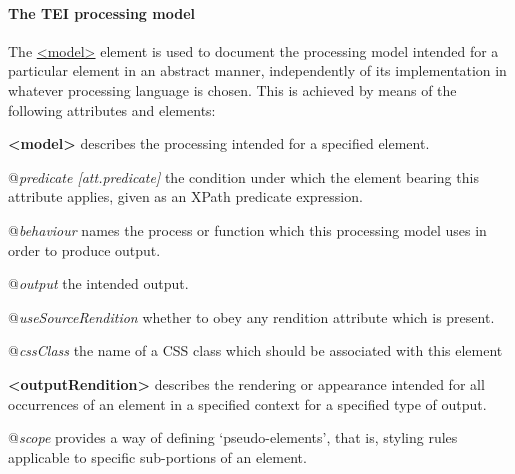\paragraph[{The TEI processing model}]{The TEI processing model}\label{TDPMPM}\par
The \hyperref[TEI.model]{<model>} element is used to document the processing model intended for a particular element in an abstract manner, independently of its implementation in whatever processing language is chosen. This is achieved by means of the following attributes and elements: 
\begin{sansreflist}
  
\item [\textbf{<model>}] describes the processing intended for a specified element.\hfil\\[-10pt]\begin{sansreflist}
    \item[@{\itshape predicate [att.predicate]}]
  the condition under which the element bearing this attribute applies, given as an XPath predicate expression.
    \item[@{\itshape behaviour}]
  names the process or function which this processing model uses in order to produce output.
    \item[@{\itshape output}]
  the intended output.
    \item[@{\itshape useSourceRendition}]
  whether to obey any rendition attribute which is present.
    \item[@{\itshape cssClass}]
  the name of a CSS class which should be associated with this element
\end{sansreflist}  
\item [\textbf{<outputRendition>}] describes the rendering or appearance intended for all occurrences of an element in a specified context for a specified type of output.\hfil\\[-10pt]\begin{sansreflist}
    \item[@{\itshape scope}]
  provides a way of defining ‘pseudo-elements’, that is, styling rules applicable to specific sub-portions of an element.
\end{sansreflist}  
\end{sansreflist}
